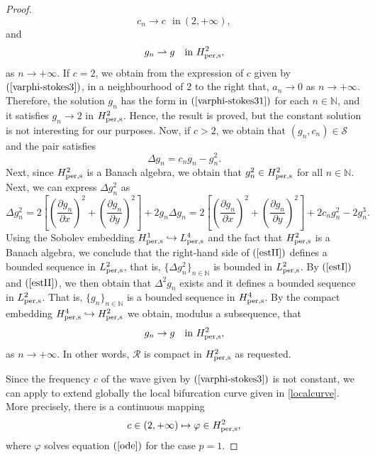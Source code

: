 \documentclass[12pt,reqno,a4paper]{amsart} %
\numberwithin{equation}{section}
\numberwithin{figure}{section}
\begin{document}
\begin{proof}
	$$c_n\rightarrow c\ \ \ \mbox{in}\ \left(2,+\infty\right),$$
	and
	$$g_n\rightharpoonup g\ \ \ \mbox{in}\ H_{\rm per,s}^2,$$
	as $n\rightarrow +\infty$. If $c=2$, we obtain from the expression of $c$ given by $(\ref{varphi-stokes3})$, in a neighbourhood of $2$ to the right that, $a_n\rightarrow 0$ as $n\rightarrow +\infty$. Therefore, the solution $g_n$ has the form in $(\ref{varphi-stokes31})$ for each $n\in\mathbb{N}$, and it satisfies $g_n\rightarrow 2$ in $H_{\rm per,s}^2$. Hence, the result is proved, but the constant solution is not interesting for our purposes. Now, if $c>2$, we obtain that $(g_n,c_n)\in \mathcal{S}$ and the pair satisfies
	\begin{equation}\label{estI}
		\Delta g_n=c_ng_n-g_n^2.
	\end{equation}
	\indent Next, since $H_{\rm per,s}^2$ is a Banach algebra, we obtain that $g_n^2\in H_{\rm per,s}^2$ for all $n\in\mathbb{N}$. Next, we can express $\Delta g_n^2$ as
	\begin{equation}\label{estII}
	\Delta g_n^2=2\left[\left(\frac{\partial g_n}{\partial x}\right)^2+\left(\frac{\partial g_n}{\partial y}\right)^2\right]+2g_n\Delta g_n=2\left[\left(\frac{\partial g_n}{\partial x}\right)^2+\left(\frac{\partial g_n}{\partial y}\right)^2\right]+2c_ng_n^2-2g_n^3. 
	\end{equation}
	Using the Sobolev embedding $H_{\rm per,s}^1\hookrightarrow L_{\rm per,s}^4$ and the fact that $H_{\rm per,s}^2$ is a Banach algebra, we conclude that the right-hand side of $(\ref{estII})$ defines a bounded sequence in $L_{\rm per,s}^2$, that is, $\{\Delta g_n^2\}_{n\in\mathbb{N}}$ is bounded in $L_{\rm per,s}^2$. By $(\ref{estI})$ and $(\ref{estII})$, we then obtain that $\Delta^2 g_n$ exists and it defines a bounded sequence in $L_{\rm per,s}^2$. That is, $\{g_n\}_{n\in\mathbb{N}}$ is a bounded sequence in $H_{\rm per,s}^4$. By the compact embedding $H_{\rm per,s}^4\hookrightarrow H_{\rm per,s}^2$ we obtain, modulus a subsequence, that $$g_n\rightarrow g\ \ \ \mbox{in}\ H_{\rm per,s}^2,$$
	as $n\rightarrow +\infty$. In other words, $\mathcal{R}$ is compact in $H_{\rm per,s}^2$ as requested.
	
	\indent Since the frequency $c$ of the wave given by $(\ref{varphi-stokes3})$ is not constant, we can apply \cite[Theorem 9.1.1]{buffoni-toland} to extend globally the local bifurcation curve given in \eqref{localcurve}. More precisely, there is a continuous mapping
	\begin{equation}\label{globalcurve}
		c \in \left( 2, +\infty \right) \mapsto \varphi \in H_{\rm per,s}^{2},
	\end{equation}
	where $\varphi$ solves equation $(\ref{ode})$ for the case $p=1$.
\end{proof}
\end{document}
